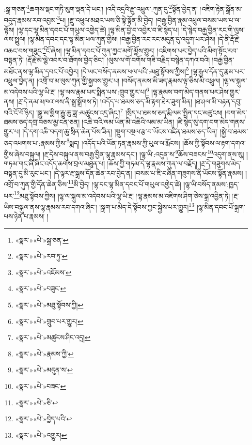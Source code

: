 :སྒྲ་གཅན་\footnote{«སྣར་»«པེ་»སྒྲ་ཅན་}ཆགས་སྡང་གཏི་མུག་ལྡན་དེ་ཡང་། །འདི་འདྲའི་རྫུ་འཕྲུལ་:ཀུན་དུ་\footnote{«སྣར་»«པེ་»རབ་ཏུ་}སྟོན་བྱེད་ན། །འཇིག་རྟེན་སྒྲོན་མ་བདུད་རྣམས་རབ་འབྱམ་\footnote{«སྣར་»«པེ་»འཇོམས་}པ། །རྫུ་འཕྲུལ་མཐའ་ཡས་ཅི་སྟེ་སྟོན་མི་བྱེད། །བརྒྱ་བྱིན་རྣམ་འཕྲུལ་བསམ་ཡས་པ་ལ་ལྟོས། །ལྷ་དང་ལྷ་མིན་དབང་པོ་གཡུལ་འགྱེད་ཚེ། །ལྷ་མིན་བྱེ་བ་འབྱེར་བ་ཇི་སྙེད་པ། །དེ་སྙེད་བརྒྱ་བྱིན་རང་གི་ལུས་ལས་སྤྲུལ། །ལྷ་མིན་དབང་དང་ལྷ་མིན་ཕལ་ཀུན་གྱིས། །བརྒྱ་བྱིན་རང་རང་མདུན་དུ་འདུག་པར་ཤེས། །དེ་ནི་རྡོ་རྗེ་འཆང་བས་གཟུང་\footnote{«སྣར་»«པེ་»བཟུང་}ངོ་ཞེས། །ལྷ་མིན་དབང་པོ་ཀུན་ཀྱང་མགོ་མྱོས་གྱུར། །འཇིགས་པར་བྱེད་པའི་མིག་སྟོང་རབ་བསྟན་ཏེ། །རྡོ་རྗེ་མེ་ལྕེ་འབར་བ་ཐོགས་བྱེད་ཅིང་། །ལུས་ལ་གོ་བགོས་གཟི་བརྗིད་བསྙེན་དཀའ་བའི། །བརྒྱ་བྱིན་མཐོང་ནས་ལྷ་མིན་དབང་པོ་འབྱེར། །དེ་ཡང་བསོད་ནམས་ཕལ་པའི་:མཐུ་སྟོབས་ཀྱིས།\footnote{«སྣར་»«པེ་»མཐུ་སྟོབས་ཀྱི།} །ལྷ་རྒྱལ་དོན་དུ་རྣམ་པར་འཕྲུལ་བྱེད་ན། །འགྲོ་བ་མ་ལུས་ཀུན་གྱི་སྐྱབས་གྱུར་པ། །བསོད་ནམས་མི་ཟད་རྣམས་ལྟ་ཅིས་མི་འཕྲུལ། །ལྷ་ལ་སྐུལ་མ་འདེབས་པའི་ལྷ་ཡི་རྔ། །ལྷ་ལས་རྣམ་པར་སྨིན་པས་:གྲུབ་གྱུར་པ།\footnote{«སྣར་»«པེ་»གྲུབ་པར་གྱུར།} །ལྷ་རྣམས་བག་མེད་གནས་པར་ཤེས་གྱུར་ནས། །རྔ་དེ་ནམ་མཁའ་ལས་ནི་སྒྲ་སྒྲོགས་ཏེ། །འདོད་པ་ཐམས་ཅད་མི་རྟག་ཐེར་ཟུག་མིན། །ཐ་ཤལ་མི་བརྟན་དབུ་བའི་ངོ་བོ་ཉིད། །སྒྱུ་མ་སྨིག་རྒྱུ་ཆུ་ཟླ་:མཚུངས་འདྲ་ཞིང་།\footnote{«སྣར་»«པེ་»མཚུངས་ཤིང་འདྲ།} །སྲིད་པ་ཐམས་ཅད་རྨི་ལམ་སྤྲིན་དང་མཚུངས། །བག་མེད་ཐམས་ཅད་དགྲ་བཅས་མྱ་ངན་ཅན། །འཆི་བའི་ལམ་ཡིན་མི་འཆིའི་ལམ་མ་ཡིན། །ཇི་སྙེད་སུ་དག་བག་མེད་གནས་གྱུར་པ། །དེ་དག་འཆི་བདག་ཆུ་སྲིན་ཆེན་པོས་ཟིན། །སྡུག་བསྔལ་རྩ་བ་ཡོངས་འཛིན་ཐམས་ཅད་ཡིན། །སྐྱེ་བ་ཐམས་ཅད་འཕགས་པ་:རྣམས་ཀྱིས་\footnote{«སྣར་»«པེ་»རྣམས་ཀྱི་}སྨད། །འདོད་པའི་ཡོན་ཏན་རྣམས་ཀྱི་ཡུལ་ལ་རྨོངས། །ཆོས་ཀྱི་སྟོབས་ལ་རྟག་དགའ་གྱིས་ཞེས་བསྐུལ། །རྔ་དེས་བསྐུལ་ནས་བརྒྱ་བྱིན་ལྷ་རྣམས་དང་། །ལྷ་ཡི་:འདུན་ས་\footnote{«སྣར་»«པེ་»མདུན་ས་}ཆོས་བཟངས་\footnote{«སྣར་»«པེ་»བཟང་}འདུག་ནས་སུ། །གཏམ་གང་ཞི་ཞིང་འདོད་ཆགས་བྲལ་མཐུན་པ། །ཆོས་ཀྱི་གཏམ་དེ་ལྷ་རྣམས་ཀུན་ལ་བརྗོད། །རྔ་དེ་གཟུགས་མེད་བསྟན་དུ་མི་རུང་ཡང་། །དེ་ལྟར་རྔ་སྒྲས་དོན་ཆེན་རབ་བྱེད་ན། །བསམ་པ་ཇི་བཞིན་གཟུགས་ནི་ཡོངས་སྟོན་རྣམས། །འགྲོ་བ་ཀུན་གྱི་དོན་ཆེན་ཅིས་\footnote{«སྣར་»«པེ་»ཅི་}མི་བྱེད། །ལྷ་དང་ལྷ་མིན་དབང་པོ་གཡུལ་འགྱེད་ཚེ། །ལྷ་ཡི་བསོད་ནམས་:ཁྱད་པར་\footnote{«སྣར་»«པེ་»བྱེད་པའི་}མཐུ་སྟོབས་ཀྱིས། །ལྷ་ལ་སྐུལ་མ་འདེབས་པའི་ལྷ་ཡི་རྔ། །ལྷ་རྣམས་མ་འཇིགས་ཤིག་ཅེས་སྒྲ་འབྱིན་ཏེ། །རྔ་ཡིས་བསྐུལ་ནས་ལྷ་རྣམས་རབ་དགའ་ཞིང་། །སྐྲག་པ་མེད་དེ་སྟོབས་ཀྱང་སྐྱེས་པར་གྱུར།\footnote{«སྣར་»«པེ་»འགྱུར།} །ལྷ་མིན་དབང་པོ་སྐྲག་པས་ཉེན་པ་རྣམས། །
